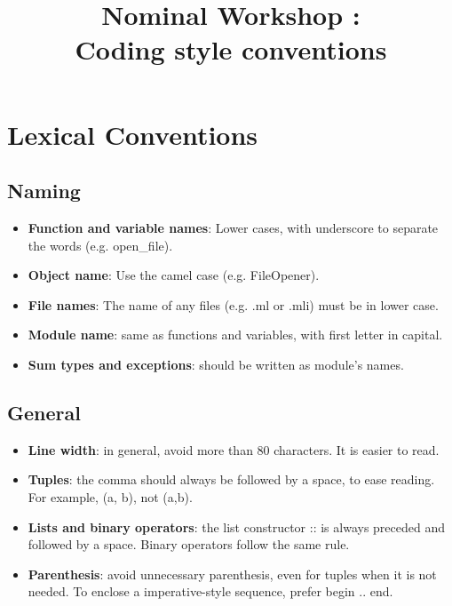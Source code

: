 \documentclass[12pt,a4paper]{article}
\title{Nominal Workshop : \\
  Coding style conventions}
\begin{document}
\maketitle

\section{Lexical Conventions}

\subsection{Naming}

\medskip

\begin{itemize}
\item \textbf{Function and variable names}: Lower cases, with underscore to 
  separate the words (e.g. open\_file).
\item \textbf{Object name}: Use the camel case (e.g. FileOpener).
\item \textbf{File names}: The name of any files (e.g. .ml or .mli) must be in
  lower case.
\item \textbf{Module name}: same as functions and variables, with first letter
  in capital. 
\item \textbf{Sum types and exceptions}: should be written as module's names.
\end{itemize}

\subsection{General}

\medskip 

\begin{itemize}
\item \textbf{Line width}: in general, avoid more than 80 characters. It is
  easier to read.
\item \textbf{Tuples}: the comma should always be followed by a space, to ease
  reading. For example, \textsf{(a, b)}, not \textsf{(a,b)}.
\item \textbf{Lists and binary operators}: the list constructor \textsf{::} is
  always preceded and followed by a space. Binary operators follow the same
  rule.
\item \textbf{Parenthesis}: avoid unnecessary parenthesis, even for tuples when
  it is not needed. To enclose a imperative-style sequence, prefer \textsf{begin
    .. end}.
\end{itemize}
\end{document}
